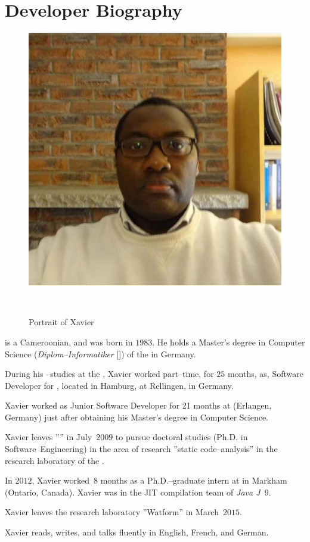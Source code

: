 \section{Developer Biography}\label{chap:biography}
\vspace{-0.9em}
\begin{figure}[!htpb]
\centering
\includegraphics[scale=0.35]{../../francais/images/XavierNOUNDOU-2}
\caption{Portrait of Xavier}~\label{fig:xaviernoumbis}
\end{figure}

 is a Cameroonian,
and was born in $1983$.
He holds a Master's degree in Computer Science
(\emph{Diplom--Informatiker} [\emph{\diplinf}]) of
the \textbf{\unibremen} in Germany.

During his \diplinf--studies at the \unibremen, Xavier worked
part--time, for $25$ months, as, Software Developer for
\textbf{\bergmann}, located in Hamburg, at Rellingen, in Germany.

Xavier worked as Junior Software Developer for 21 months
at \company{\siemens} (Erlangen, Germany) just after
obtaining his Master's degree in Computer Science.

Xavier leaves ''\siemens'' in July~$2009$ to pursue doctoral
studies (Ph.D. in Software~Engineering) in the area of research
''static code--analysis'' in the research laboratory
 of the .

In $2012$, Xavier worked~$8$ months as a Ph.D.--graduate intern
at  in Markham (Ontario, Canada).
Xavier was in the JIT compilation team of \emph{Java J~$9$}.

Xavier leaves the research laboratory ''Watform'' in March~$2015$.

Xavier reads, writes, and talks fluently in English,
French, and German.
